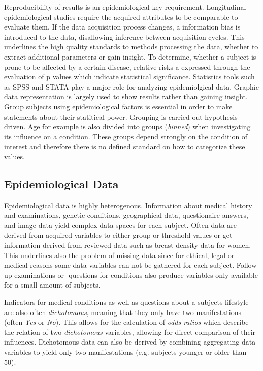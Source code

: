 \documentclass[journal]{style/vgtc}           %
\begin{document}
Reproducibility of results is an epidemiological key requirement.
%
Longitudinal epidemiological studies require the acquired attributes to be comparable to evaluate them.
%
If the data acquisition process changes, a information bias is introduced to the data, disallowing inference between acquisition cycles.
%
This underlines the high quality standards to methods processing the data, whether to extract additional parameters or gain insight.
%
To determine, whether a subject is prone to be affected by a certain disease, relative risks a expressed through the evaluation of p values which indicate statistical significance.
%
Statistics tools such as SPSS and STATA play a major role for analyzing epidemiolgical data. 
%
Graphic data representation is largely used to show results rather than gaining insight.
\\
Group subjects using epidemiological factors is essential in order to make statements about their statitical power.
%
Grouping is carried out hypothesis driven.
%
Age for example is also divided into groups (\emph{binned}) when investigating its influence on a condition.
%
These groups depend strongly on the condition of interest and therefore there is no defined standard on how to categorize these values.
	
\subsection{Epidemiological Data} \label{EpidemiologicalData}
Epidemiological data is highly heterogenous.
%
Information about medical history and examinations, genetic conditions, geographical data, questionaire answers, and image data yield complex data spaces for each subject.
%
Often data are derived from acquired variables to either group or threshold values or get information derived from reviewed data such as breast density data for women.
%
This underlines also the problem of missing data since for ethical, legal or medical reasons some data variables can not be gathered for each subject.
%
Follow-up examinations or -questions for conditions also produce variables only available for a small amount of subjects.
%

Indicators for medical conditions as well as questions about a subjects lifestyle are also often \emph{dichotomous}, meaning that they only have two manifestations (often \emph{Yes} or \emph{No}).
%
This allows for the calculation of \emph{odds ratios} which describe the relation of two \emph{dichotomous} variables, allowing for direct comparison of their influences.
%
Dichotomous data can also be derived by combining aggregating data variables to yield only two manifestations (e.g. subjects younger or older than 50).
%
\end{document}
